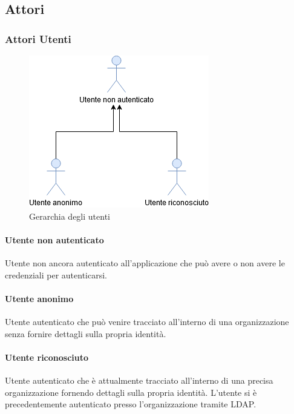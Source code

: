 \subsection{Attori}
\subsubsection{Attori Utenti}

\begin{figure}[h]
  \caption{Gerarchia degli utenti}
  \centering
    \includegraphics[scale=0.6]{sezioni/UseCase/Immagini/Utenti.png}
\end{figure}

\paragraph{Utente non autenticato}
Utente non ancora autenticato all'applicazione che può avere o non avere le credenziali per autenticarsi.
\paragraph{Utente anonimo}
Utente autenticato che può venire tracciato all'interno di una organizzazione senza fornire dettagli sulla propria identità.
\paragraph{Utente riconosciuto}
Utente autenticato che è attualmente tracciato all'interno di una precisa organizzazione fornendo dettagli sulla propria identità.
L'utente si è precedentemente autenticato presso l'organizzazione tramite LDAP.



